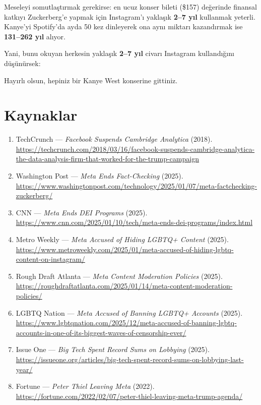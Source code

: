 \documentclass{article}
\begin{document}
Meseleyi somutlaştırmak gerekirse: en ucuz konser bileti (\$157) değerinde finansal katkıyı Zuckerberg'e yapmak için Instagram'ı yaklaşık \textbf{2--7 yıl} kullanmak yeterli. Kanye'yi Spotify'da ayda 50 kez dinleyerek ona aynı miktarı kazandırmak ise \textbf{131--262 yıl} alıyor.

Yani, bunu okuyan herkesin yaklaşık \textbf{2--7 yıl} civarı Instagram kullandığını düşünürsek:

Hayırlı olsun, hepiniz bir Kanye West konserine gittiniz.

\section*{Kaynaklar}

\begin{enumerate}

\item TechCrunch --- \textit{Facebook Suspends Cambridge Analytica} (2018).
  \url{https://techcrunch.com/2018/03/16/facebook-suspends-cambridge-analytica-the-data-analysis-firm-that-worked-for-the-trump-campaign}
\item Washington Post --- \textit{Meta Ends Fact-Checking} (2025).
  \url{https://www.washingtonpost.com/technology/2025/01/07/meta-factchecking-zuckerberg/}
\item CNN --- \textit{Meta Ends DEI Programs} (2025).
  \url{https://www.cnn.com/2025/01/10/tech/meta-ends-dei-programs/index.html}
\item Metro Weekly --- \textit{Meta Accused of Hiding LGBTQ+ Content} (2025).
  \url{https://www.metroweekly.com/2025/01/meta-accused-of-hiding-lgbtq-content-on-instagram/}
\item Rough Draft Atlanta --- \textit{Meta Content Moderation Policies} (2025).
  \url{https://roughdraftatlanta.com/2025/01/14/meta-content-moderation-policies/}
\item LGBTQ Nation --- \textit{Meta Accused of Banning LGBTQ+ Accounts} (2025).
  \url{https://www.lgbtqnation.com/2025/12/meta-accused-of-banning-lgbtq-accounts-in-one-of-its-biggest-waves-of-censorship-ever/}
\item Issue One --- \textit{Big Tech Spent Record Sums on Lobbying} (2025).
  \url{https://issueone.org/articles/big-tech-spent-record-sums-on-lobbying-last-year/}
\item Fortune --- \textit{Peter Thiel Leaving Meta} (2022).
  \url{https://fortune.com/2022/02/07/peter-thiel-leaving-meta-trump-agenda/}


\end{enumerate}
\end{document}
